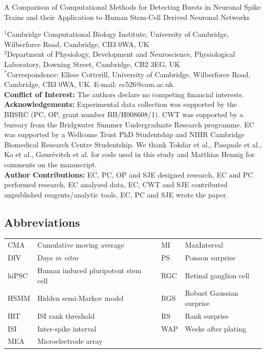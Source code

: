 \documentclass[12pt, titlepage]{article}
\begin{document}
	\begin{titlepage}
		\begin{center}
		
	
			{\LARGE   A Comparison of Computational Methods for Detecting Bursts in Neuronal Spike Trains and their Application to Human Stem-Cell Derived Neuronal Networks}
			\\ 
			\end{center}
		\noindent$^1$Cambridge Computational Biology Institute, University of Cambridge, Wilberforce Road, Cambridge, CB3 0WA, UK
		\\$^2$Department of Physiology, Development and Neuroscience, Physiological Laboratory, Downing Street, Cambridge, CB2 3EG, UK
		\\$^*$Correspondence: Ellese Cotterill, University of Cambridge, Wilberforce Road, Cambridge,
		CB3 0WA, UK. E-mail: ec526@cam.ac.uk.
		 \bigskip \\ \textbf{Conflict of Interest:} The authors declare no competing financial interests.
		  \bigskip \\ \textbf{Acknowledgements:} Experimental data collection was supported by the BBSRC (PC, OP, grant number BB/H008608/1). CWT was supported by a bursary from the Bridgwater Summer Undergraduate Research programme. EC was supported by a Wellcome Trust PhD Studentship and NIHR Cambridge Biomedical Research Centre Studentship. We thank Tokdar et al., Pasquale et al., Ko et al., Gour\'{e}vitch et al. for code used in this study and Matthias Hennig for comments on the manuscript. 
		 \bigskip \\ \textbf{Author Contributions:} EC, PC, OP and SJE designed research, EC and PC performed research, EC analysed data, EC, CWT and SJE contributed unpublished reagents/analytic tools, EC, PC and SJE wrote the paper.
	\end{titlepage}
	 \subsection*{Abbreviations}
	 \begin{tabular}{llll}
	 	\hline
	 	CMA & Cumulative moving average & MI & MaxInterval
	 	\\DIV &  Days \textit{in vitro} & PS &  Poisson surprise
	 	\\hiPSC & Human induced pluripotent stem cell \ \ \ &  RGC & Retinal ganglion cell
	 	\\HSMM &  Hidden semi-Markov model & RGS & Robust Gaussian surprise
	 	\\IRT & ISI rank threshold &	RS & Rank surprise
	 	\\ISI &  Inter-spike interval & WAP & Weeks after plating
	 	\\MEA & Microelectrode array & 
	 	\\ \hline
	 \end{tabular}
\end{document}
